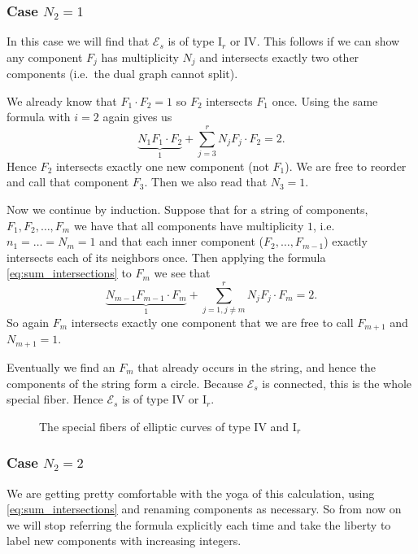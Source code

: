 \subsubsection{Case $N_2 = 1$} 
In this case we will find that $\mathscr E_s$ is of type $\text{I}_r$ or $\text{IV}$. This follows if we can show any component $F_j$ has multiplicity $N_j$ and intersects exactly two other components (i.e.\ the dual graph cannot split). 

We already know that $F_1 \cdot F_2 = 1$ so $F_2$ intersects $F_1$ once. Using the same formula with $i = 2$ again gives us \[
	\underbrace{N_1 F_1\cdot F_2}_{1} + \sum_{j = 3}^{r}  N_j F_j \cdot F_2 = 2
.\] 
Hence $F_2$ intersects exactly one new component (not $F_1$). We are free to reorder and call that component $F_3$. Then we also read that $N_3 = 1$.  

Now we continue by induction. Suppose that for a string of components, $F_1, F_2, \ldots, F_m$ we have that all components have multiplicity $1$, i.e.\ $n_1 = \ldots = N_{m} = 1$ and that each inner component ($F_2, \ldots, F_{m -1}$) exactly intersects each of its neighbors once. 
Then applying the formula \eqref{eq:sum_intersections} to $F_m$ we see that \[
	\underbrace{N_{m -1} F_{m - 1} \cdot F_m}_1 + \sum_{j= 1, j\ne m}^{r} N_j F_j \cdot F_m  = 2
.\] 
So again $F_m$ intersects exactly one component that we are free to call $F_{m + 1}$ and $N_{m + 1} = 1$. 

Eventually we find an $F_m$ that already occurs in the string, and hence the components of the string form a circle. Because $\mathscr E _s$ is connected, this is the whole special fiber.  Hence $\mathscr E _s $ is of type $\text{IV}$ or $\text{I}_{r}$. 

\begin{figure}[ht]
    \centering
    \caption{The special fibers of elliptic curves of type $\text{IV}$ and $\mathrm{I}_r$}
    \label{fig:type-iv-and-ir}
\end{figure}

\subsubsection{Case $N_2 = 2$} 
We are getting pretty comfortable with the yoga of this calculation,  using \eqref{eq:sum_intersections} and renaming components as necessary. 
So from now on we will stop referring the formula explicitly each time and take the liberty to label new components with increasing integers.

